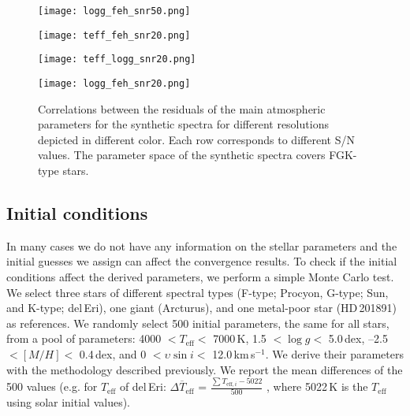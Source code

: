 \documentclass[fleqn,usenatbib]{mnras}
\begin{document}
\begin{figure*}
\begin{minipage}{0.33\textwidth}
 \end{minipage}
 \begin{minipage}{0.33\textwidth}
  \texttt{[image: logg\_feh\_snr50.png]} 
 \end{minipage}
 \centering
 \begin{minipage}{0.33\textwidth}
  \texttt{[image: teff\_feh\_snr20.png]} 
 \end{minipage}
 \begin{minipage}{0.33\textwidth}
  \texttt{[image: teff\_logg\_snr20.png]} 
 \end{minipage}
 \begin{minipage}{0.33\textwidth}
  \texttt{[image: logg\_feh\_snr20.png]} 
 \end{minipage}

 \caption{Correlations between the residuals of the main atmospheric parameters for the synthetic spectra for different resolutions depicted in different color. 
 Each row corresponds to different S/N values. The parameter space of the synthetic spectra covers FGK-type stars.}
 \label{snr_correlations}
\end{figure*}


\subsection{Initial conditions}\label{initial_conditions}

In many cases we do not have any information on the stellar parameters and the initial guesses we assign can affect the convergence results. 
To check if the initial conditions affect the derived parameters, we perform a simple Monte Carlo test. We select three stars of different spectral types (F-type; Procyon, G-type; Sun, 
and K-type; del\,Eri), one giant (Arcturus), and one metal-poor star (HD\,201891) as references. We randomly select 500 initial parameters, the same for all stars, from a pool of parameters:  
4000 $< T_{\mathrm{eff}} <$ 7000\,K, 1.5 $< \log g <$ 5.0\,dex, --2.5 $< [M/H] <$ 0.4\,dex, and 0 $< \upsilon\sin i <$ 12.0\,km\,s$^{-1}$. We derive their parameters with the methodology 
described previously. We report the mean differences of the 500 values (e.g. for $T_{\mathrm{eff}}$ of del\,Eri: 
$\overline{\Delta T_{\mathrm{eff}}}$ = $\frac{\sum T_{\mathrm{eff}, i} - 5022}{500}$ , where 5022\,K is the $T_{\mathrm{eff}}$ using solar initial values). 
\end{document}
